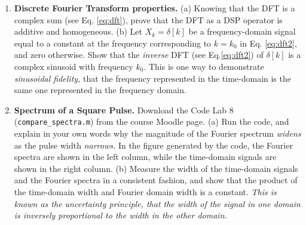 \documentclass{article}
\begin{document}
\begin{enumerate}
\item \textbf{Discrete Fourier Transform properties.}  (a) Knowing that the DFT is a complex sum (see Eq. \ref{eq:dft}), prove that the DFT as a DSP operator is additive and homogeneous.  (b) Let $X_k = \delta[k]$ be a frequency-domain signal equal to a constant at the frequency corresponding to $k=k_0$ in Eq. \ref{eq:dft2}, and zero otherwise.  Show that the \textit{inverse} DFT (see Eq.\ref{eq:dft2}) of $\delta[k]$ is a complex sinusoid with frequency $k_0$.  This is one way to demonstrate \textit{sinusoidal fidelity,} that the frequency represented in the time-domain is the same one represented in the frequency domain. \\
\item \textbf{Spectrum of a Square Pulse.} Download the Code Lab 8 (\verb+compare_spectra.m+) from the course Moodle page.  (a) Run the code, and explain in your own words why the magnitude of the Fourier spectrum \textit{widens} as the pulse width \textit{narrows.}  In the figure generated by the code, the Fourier spectra are shown in the left column, while the time-domain signals are shown in the right column. (b) Measure the width of the time-domain signals and the Fourier spectra in a consistent fashion, and show that the product of the time-domain width and Fourier domain width is a constant.  \textit{This is known as the uncertainty principle, that the width of the signal in one domain is inversely proportional to the width in the other domain.}
\end{enumerate}
\end{document}
